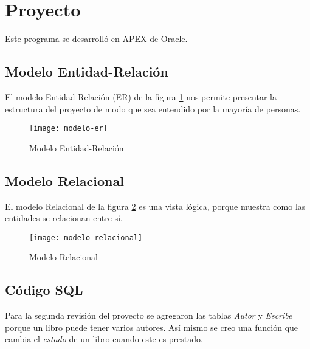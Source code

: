 \section{Proyecto}
Este programa se desarrolló en APEX de Oracle.
\subsection{Modelo Entidad-Relación}
El modelo Entidad-Relación (ER) de la figura \ref{fig:modelo-er} nos permite presentar la estructura del proyecto de modo que sea entendido por la mayoría de personas.
\begin{figure}[H]
  \centering
  \texttt{[image: modelo-er]}
  \caption{Modelo Entidad-Relación}
  \label{fig:modelo-er}
\end{figure}

\subsection{Modelo Relacional}
El modelo Relacional de la figura \ref{fig:modelo-relacional} es una vista lógica, porque muestra como las entidades se relacionan entre sí.
\begin{figure}[H]
  \centering
  \texttt{[image: modelo-relacional]}
  \caption{Modelo Relacional}
  \label{fig:modelo-relacional}
\end{figure}

\subsection{Código SQL}


Para la segunda revisión del proyecto se agregaron las tablas \textit{Autor} y \textit{Escribe} porque un libro puede tener varios autores. Así mismo se creo una función que cambia el \textit{estado} de un libro cuando este es prestado.
